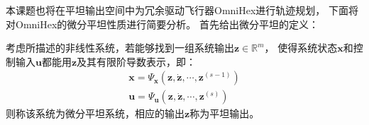 本课题也将在平坦输出空间中为冗余驱动飞行器OmniHex进行轨迹规划，
下面将对OmniHex的微分平坦性质进行简要分析。
首先给出微分平坦的定义：
\begin{definition}[（微分平坦）]
    \label{def:differential_flatness}
    考虑所描述的非线性系统，若能够找到一组系统输出$\bm{z} \in \mathbb{R}^m$，
    使得系统状态$\bm{x}$和控制输入$\bm{u}$都能用$\bm{z}$及其有限阶导数表示，即：
    \begin{gather}
        \bm{x} = \bm{\varPsi}_{\bm{x}}(\bm{z}, \dot{\bm{z}}, \cdots, \bm{z}^{(s-1)}) \label{equ:state_flat_map} \\
        \bm{u} =  \bm{\varPsi}_{\bm{u}}(\bm{z}, \dot{\bm{z}}, \cdots, \bm{z}^{(s)}) \label{equ:input_flat_map}
    \end{gather}
    则称该系统为微分平坦系统，相应的输出$\bm{z}$称为平坦输出。
\end{definition}

